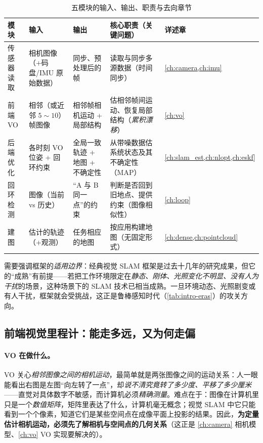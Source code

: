 \begin{table}[H]\centering\small
\caption{五模块的输入、输出、职责与去向章节}
\label{tab:intro-modules}
\begin{tabular}{p{} p{} p{} p{} p{}}
\toprule
模块 & 输入 & 输出 & 核心职责（关键问题） & 详述章 \\
\midrule
传感器读取 & 相机图像（+码盘/IMU 原始数据） & 同步、预处理后的帧 & 读取与同步多源数据（时间同步） & \cref{ch:camera,ch:imu} \\
前端 VO & 相邻（或近邻 $5\!\sim\!10$）帧图像 & 相邻帧相机运动 + 局部结构 & 估相邻帧间运动、恢复局部结构（\emph{累积漂移}） & \cref{ch:vo} \\
后端优化 & 各时刻 VO 位姿 + 回环约束 & 全局一致轨迹 + 地图 + 不确定性 & 从带噪数据估系统状态及其不确定性（MAP） & \cref{ch:slam_est,ch:nlopt,ch:eskf} \\
回环检测 & 图像（当前 vs 历史） & “A 与 B 同一点”的约束 & 判断是否回到旧地点、提供约束（图像相似性） & \cref{ch:loop} \\
建图 & 估计的轨迹（+观测） & 任务相应的地图 & 按应用构建地图（无固定形式） & \cref{ch:dense,ch:pointcloud} \\
\bottomrule
\end{tabular}
\end{table}

\noindent 需要强调框架的\emph{适用边界}：经典视觉 SLAM 框架是过去十几年的研究成果，但它的“成熟”有前提——若把工作环境限定在\emph{静态、刚体、光照变化不明显、没有人为干扰}的场景，这种场景下的 SLAM 技术已相当成熟\cite{gaoxiang2019slam14}。一旦环境动态、光照剧变或有人干扰，框架就会受挑战，这正是鲁棒感知时代（\cref{tab:intro-eras}）的攻关方向。

\subsection{前端视觉里程计：能走多远，又为何走偏}
\label{sec:intro-vo}
\paragraph{VO 在做什么。}
VO 关心\emph{相邻图像之间的相机运动}，最简单就是两张图像之间的运动关系：人一眼能看出右图是左图“向左转了一点”，却\emph{说不清究竟转了多少度、平移了多少厘米}——直觉对具体数字不敏感，而计算机必须\emph{精确测量}\cite{gaoxiang2019slam14}。难点在于：图像在计算机里只是一个\emph{数值矩阵}，矩阵里表达了什么，计算机毫无概念；视觉 SLAM 中它只能看到一个个像素，知道它们是某些空间点在成像平面上投影的结果。因此，\textbf{为定量估计相机运动，必须先了解相机与空间点的几何关系}（这正是 \cref{ch:camera} 相机模型、\cref{ch:vo} VO 实现要解决的）。

